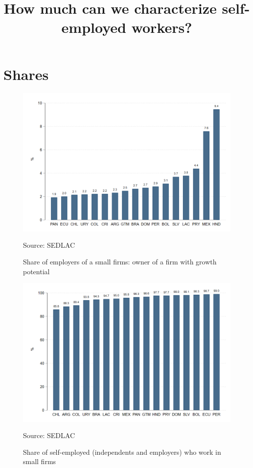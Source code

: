 \documentclass[english]{article}
\begin{document}
\title{How much can we characterize self-employed workers?}
\maketitle

\section{Shares}

\begin{figure}[H]
            \justifying
                \caption{Share of employers of a small firms: owner of a firm with growth potential}  
            \centerline{\includegraphics[scale=.3]{latex/figures/Self-employed/employer_growthfirms.png}}
                \label{fig:owner-}
                \footnotesize{Source: SEDLAC}
\end{figure}

\begin{figure}[H]
            \justifying
                \caption{Share of self-employed (independents and employers) who work in small firms}  
            \centerline{\includegraphics[scale=.3]{latex/figures/Self-employed/selfemployed_small.png}}
                \label{fig:owner-}
                \footnotesize{Source: SEDLAC}
\end{figure}
\end{document}
